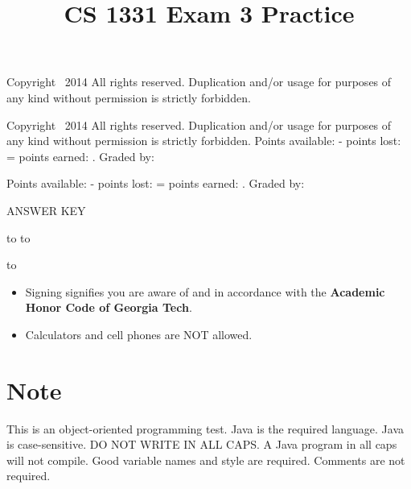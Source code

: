 \documentclass[addpoints,9pt]{exam}
\title{CS 1331 Exam 3 Practice}
\date{}
\begin{document}
\maketitle
\thispagestyle{head}
\firstpageheader{}
              {\tiny Copyright \textcopyright\ 2014 All rights reserved. Duplication and/or usage for purposes of any kind without permission is strictly forbidden.}
              {}

\runningheader{}
              {\tiny Copyright \textcopyright\ 2014 All rights reserved. Duplication and/or usage for purposes of any kind without permission is strictly forbidden.}
              {}
              {}
              {Points available: \pointsonpage{ \thepage} -
               points lost: \makebox[.5in]{\hrulefill} =
               points earned:  \makebox[.5in]{\hrulefill}.
              Graded by: \makebox[.75in]{\hrulefill}}

              {}
              {Points available: \pointsonpage{ \thepage} -
               points lost: \makebox[.5in]{\hrulefill} =
               points earned:  \makebox[.5in]{\hrulefill}.
              Graded by: \makebox[.75in]{\hrulefill}}

\ifprintanswers
\begin{center}
{\LARGE ANSWER KEY}
\end{center}
\else
\vspace{0.1in}
\hbox to \textwidth{Name (print clearly): \enspace\hrulefill}
\vspace{0.3in}
\hbox to \textwidth{Signature: \hrulefill}

\vspace{0.3in}
\hbox to \textwidth{GT account username (gtg, gth, msmith3, etc): \enspace\hrulefill}

\fi

\vfill

\begin{itemize}
\item Signing signifies you are aware of and in accordance with the {\bf Academic Honor Code of Georgia Tech}.
\item Calculators and cell phones are NOT allowed.
\end{itemize}

\section*{Note} This is an object-oriented programming test.  Java is the required language.  Java is case-sensitive.  DO NOT WRITE IN ALL CAPS.  A Java program in all caps will not compile.  Good variable names and style are required.  Comments are not required.
\end{document}
